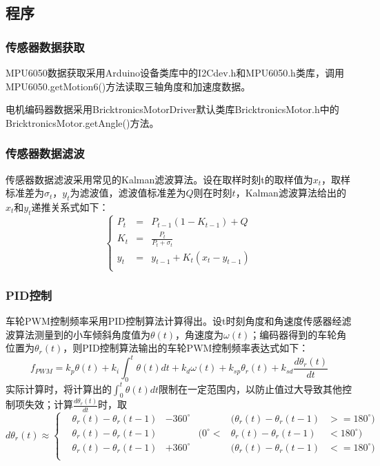 \documentclass[a4paper]{ctexart}
\begin{document}
\begin{spacing}{1.5}
\subsection{程序}
\subsubsection{传感器数据获取}
MPU6050数据获取采用Arduino设备类库中的I2Cdev.h和MPU6050.h类库，调用MPU6050.getMotion6()方法读取三轴角度和加速度数据。

电机编码器数据采用BricktronicsMotorDriver默认类库BricktronicsMotor.h中的BricktronicsMotor.getAngle()方法。
\subsubsection{传感器数据滤波}

传感器数据滤波采用常见的Kalman滤波算法。设在取样时刻t的取样值为$x_{t}$，取样标准差为$\sigma_{t}$，$y_{t}$为滤波值，滤波值标准差为$Q$则在时刻$t$，Kalman滤波算法给出的$x_{t}$和$y_{t}$递推关系式如下：
\begin{equation}
\left\{
\begin{aligned}
P_{t}&=&P_{t-1}(1-K_{t-1})+Q\\
K_{t}&=&\frac{P_{t}}{P_{t}+\sigma_{t}}\\
y_{t}&=&y_{t-1}+K_{t}(x_{t}-y_{t-1})\\
\end{aligned}
\right.
\end{equation}

\newpage
\subsubsection{PID控制}

车轮PWM控制频率采用PID控制算法计算得出。设t时刻角度和角速度传感器经滤波算法测量到的小车倾斜角度值为$\theta(t)$，角速度为$\omega(t)$；编码器得到的车轮角位置为$\theta_{r}(t)$，则PID控制算法输出的车轮PWM控制频率表达式如下：
\begin{equation}
f_{PWM}=k_{p}\theta(t)+k_{i}\int_{0}^{t}\theta(t) dt+k_{d}\omega(t)+k_{sp}\theta_{r}(t)+k_{sd}\frac{d\theta_{r}(t)}{dt}
\end{equation}
实际计算时，将计算出的$\int_{0}^{t}\theta(t) dt$限制在一定范围内，以防止值过大导致其他控制项失效；计算$\frac{d\theta_{r}(t)}{dt}$时，取
$$
d\theta_{r}(t)\approx
\left\{
\begin{aligned}
&\theta_{r}(t)-\theta_{r}(t-1)&-360^\circ 
&&(\theta_{r}(t)-\theta_{r}(t-1)&>=180^\circ)\\
&\theta_{r}(t)-\theta_{r}(t-1)&
&(0^\circ<&\theta_{r}(t)-\theta_{r}(t-1)&<180^\circ)\\
&\theta_{r}(t)-\theta_{r}(t-1)&+360^\circ
&&(\theta_{r}(t)-\theta_{r}(t-1)&<=180^\circ)\\
\end{aligned}
\right.
$$

\end{spacing}
\end{document}

